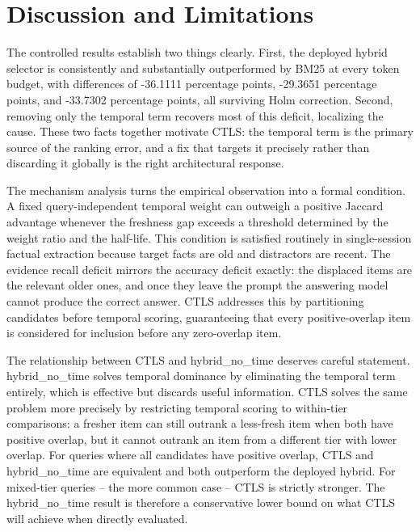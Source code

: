 \section{Discussion and Limitations}

\label{sec:discussion}

The controlled results establish two things clearly. First, the deployed hybrid selector is consistently and substantially outperformed by BM25 at every token budget, with differences of -36.1111 percentage points, -29.3651 percentage points, and -33.7302 percentage points, all surviving Holm correction. Second, removing only the temporal term recovers most of this deficit, localizing the cause. These two facts together motivate CTLS: the temporal term is the primary source of the ranking error, and a fix that targets it precisely rather than discarding it globally is the right architectural response.

The mechanism analysis turns the empirical observation into a formal condition. A fixed query-independent temporal weight can outweigh a positive Jaccard advantage whenever the freshness gap exceeds a threshold determined by the weight ratio and the half-life. This condition is satisfied routinely in single-session factual extraction because target facts are old and distractors are recent. The evidence recall deficit mirrors the accuracy deficit exactly: the displaced items are the relevant older ones, and once they leave the prompt the answering model cannot produce the correct answer. CTLS addresses this by partitioning candidates before temporal scoring, guaranteeing that every positive-overlap item is considered for inclusion before any zero-overlap item.

The relationship between CTLS and hybrid\_no\_time deserves careful statement. hybrid\_no\_time solves temporal dominance by eliminating the temporal term entirely, which is effective but discards useful information. CTLS solves the same problem more precisely by restricting temporal scoring to within-tier comparisons: a fresher item can still outrank a less-fresh item when both have positive overlap, but it cannot outrank an item from a different tier with lower overlap. For queries where all candidates have positive overlap, CTLS and hybrid\_no\_time are equivalent and both outperform the deployed hybrid. For mixed-tier queries -- the more common case -- CTLS is strictly stronger. The hybrid\_no\_time result is therefore a conservative lower bound on what CTLS will achieve when directly evaluated.

